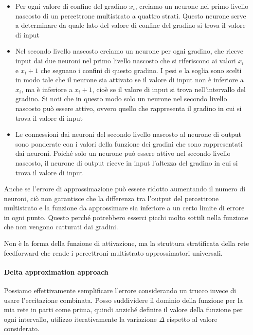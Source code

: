 \begin{itemize}
    \item Per ogni valore di confine del gradino $x_i$, creiamo un neurone nel primo livello nascosto di un percettrone multistrato a quattro strati. Questo neurone serve a determinare da quale lato del valore di confine del gradino si trova il valore di input
    \item Nel secondo livello nascosto creiamo un neurone per ogni gradino, che riceve input dai due neuroni nel primo livello nascosto che si riferiscono ai valori $x_i$ e $x_i+1$ che segnano i confini di questo gradino. I pesi e la soglia sono scelti in modo tale che il neurone sia attivato se il valore di input non è inferiore a $x_i$, ma è inferiore a $x_i+1$, cioè se il valore di input si trova nell'intervallo del gradino. Si noti che in questo modo solo un neurone nel secondo livello nascosto può essere attivo, ovvero quello che rappresenta il gradino in cui si trova il valore di input
    \item Le connessioni dai neuroni del secondo livello nascosto al neurone di output sono ponderate con i valori della funzione dei gradini che sono rappresentati dai neuroni. Poiché solo un neurone può essere attivo nel secondo livello nascosto, il neurone di output riceve in input l'altezza del gradino in cui si trova il valore di input
\end{itemize}

Anche se l'errore di approssimazione può essere ridotto aumentando il numero di neuroni, ciò non garantisce che la differenza tra l'output del percettrone multistrato e la funzione da approssimare sia inferiore a un certo limite di errore in ogni punto. Questo perché potrebbero esserci picchi molto sottili nella funzione che non vengono catturati dai gradini. 

Non è la forma della funzione di attivazione, ma la struttura stratificata della rete feedforward che rende i percettroni multistrato approssimatori universali.

\paragraph{Delta approximation approach}
Possiamo effettivamente semplificare l'errore considerando un trucco invece di usare l'eccitazione combinata. Posso suddividere il dominio della funzione per la mia rete in parti come prima, quindi anziché definire il valore della funzione per ogni intervallo, utilizzo iterativamente la variazione $\Delta$ rispetto al valore considerato.

